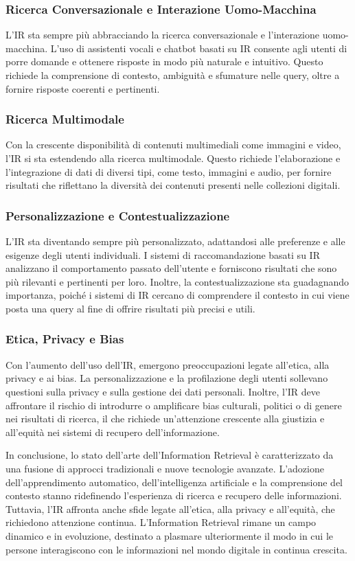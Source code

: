 \subsubsection{Ricerca Conversazionale e Interazione Uomo-Macchina}
L'IR sta sempre più abbracciando la ricerca conversazionale e l'interazione uomo-macchina. L'uso di assistenti vocali e chatbot basati su IR consente agli utenti di porre domande e ottenere risposte in modo più naturale e intuitivo. Questo richiede la comprensione di contesto, ambiguità e sfumature nelle query, oltre a fornire risposte coerenti e pertinenti.

\subsubsection{Ricerca Multimodale}
Con la crescente disponibilità di contenuti multimediali come immagini e video, l'IR si sta estendendo alla ricerca multimodale. Questo richiede l'elaborazione e l'integrazione di dati di diversi tipi, come testo, immagini e audio, per fornire risultati che riflettano la diversità dei contenuti presenti nelle collezioni digitali.

\subsubsection{Personalizzazione e Contestualizzazione}
L'IR sta diventando sempre più personalizzato, adattandosi alle preferenze e alle esigenze degli utenti individuali. I sistemi di raccomandazione basati su IR analizzano il comportamento passato dell'utente e forniscono risultati che sono più rilevanti e pertinenti per loro. Inoltre, la contestualizzazione sta guadagnando importanza, poiché i sistemi di IR cercano di comprendere il contesto in cui viene posta una query al fine di offrire risultati più precisi e utili.

\subsubsection{Etica, Privacy e Bias}
Con l'aumento dell'uso dell'IR, emergono preoccupazioni legate all'etica, alla privacy e ai bias. La personalizzazione e la profilazione degli utenti sollevano questioni sulla privacy e sulla gestione dei dati personali. Inoltre, l'IR deve affrontare il rischio di introdurre o amplificare bias culturali, politici o di genere nei risultati di ricerca, il che richiede un'attenzione crescente alla giustizia e all'equità nei sistemi di recupero dell'informazione.

In conclusione, lo stato dell'arte dell'Information Retrieval è caratterizzato da una fusione di approcci tradizionali e nuove tecnologie avanzate. L'adozione dell'apprendimento automatico, dell'intelligenza artificiale e la comprensione del contesto stanno ridefinendo l'esperienza di ricerca e recupero delle informazioni. Tuttavia, l'IR affronta anche sfide legate all'etica, alla privacy e all'equità, che richiedono attenzione continua. L'Information Retrieval rimane un campo dinamico e in evoluzione, destinato a plasmare ulteriormente il modo in cui le persone interagiscono con le informazioni nel mondo digitale in continua crescita.
